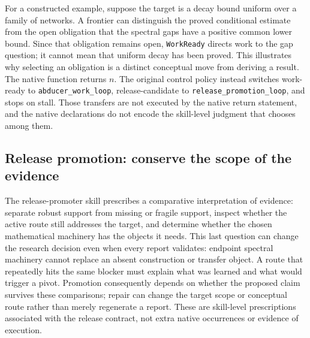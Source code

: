 For a constructed example, suppose the target is a decay bound uniform over a
family of networks. A frontier can distinguish the proved conditional estimate
from the open obligation that the spectral gaps have a positive common lower
bound. Since that obligation remains open, \texttt{Work\allowbreak Ready} directs work to the
gap question; it cannot mean that uniform decay has been proved. This illustrates
why selecting an obligation is a distinct conceptual move from deriving a result.
The native function returns $n$. The original control policy instead switches
work-ready to \texttt{abducer\_\allowbreak work\_\allowbreak loop}, release-candidate to
\texttt{release\_\allowbreak promotion\_\allowbreak loop}, and stops on stall. Those transfers are not
executed by the native return statement, and the native declarations do not encode the skill-level
judgment that chooses among them.



\subsection{Release promotion: conserve the scope of the evidence}
\label{app:granular-release-promotion-loop}
The release-promoter skill prescribes a comparative interpretation of evidence:
separate robust support from missing or fragile support, inspect whether the
active route still addresses the target, and determine whether the chosen
mathematical machinery has the objects it needs. This last question can change the
research decision even when every report validates: endpoint spectral machinery
cannot replace an absent construction or transfer object. A route that repeatedly
hits the same blocker must explain what was learned and what would trigger a
pivot. Promotion consequently depends on whether the proposed claim survives
these comparisons; repair can change the target scope or conceptual route rather
than merely regenerate a report. These are skill-level prescriptions associated
with the release contract, not extra native occurrences or evidence of execution.

